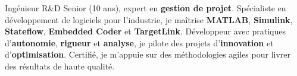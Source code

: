 \par{
Ingénieur R\&D Senior (10 ans), expert en \textbf{gestion de projet}. Spécialiste en développement de logiciels pour l'industrie, je maîtrise \textbf{MATLAB}, \textbf{Simulink}, \textbf{Stateflow}, \textbf{Embedded Coder} et \textbf{TargetLink}. Développeur avec pratiques d'\textbf{autonomie}, \textbf{rigueur} et \textbf{analyse}, je pilote des projets d'\textbf{innovation} et d'\textbf{optimisation}. Certifié, je m'appuie sur des méthodologies agiles pour livrer des résultats de haute qualité.
}
\newline
